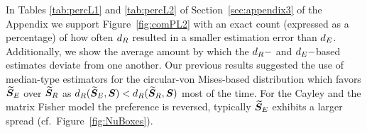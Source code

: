 In Tables \ref{tab:percL1} and \ref{tab:percL2} of Section~\ref{sec:appendix3} of the Appendix we support Figure~\ref{fig:comPL2} with an exact count (expressed as a percentage) of how often ${d_R}$ resulted in a smaller estimation error than ${d_E}$.  Additionally, we show the average amount by which the ${d_R}-$ and ${d_E}-$based estimates deviate from one another.  %
Our previous results suggested the use of median-type estimators for the circular-von Mises-based distribution which favors ${\widetilde{\bm S}_E}$ over ${\widetilde{\bm S}_R}$ as ${d_R}({\widetilde{\bm S}_E},\bm S) < {d_R}({\widetilde{\bm S}_R},\bm S)$ most of the time.  For the Cayley and the matrix Fisher model the preference is reversed, typically  ${\widetilde{\bm S}_E}$ exhibits a larger spread (cf.~Figure~\ref{fig:NuBoxes}). 


